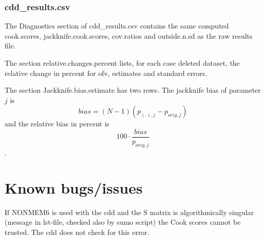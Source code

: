 \subsubsection*{cdd\_results.csv}
The Diagnostics section of
cdd\_results.csv contains the same computed cook.scores, jackknife.cook.scores, cov.ratios and
outside.n.sd as the raw results file.

The section relative.changes.percent lists, for each case deleted dataset, the relative change in percent
for ofv, estimates and standard errors.

The section Jackknife.bias.estimate
has two rows. The jackknife bias of parameter $j$ is \[bias=\left(N-1\right)\left(p_{(\cdot),j}-p_{orig,j}\right) \]
and the relative bias in percent is \[100\cdot\frac{bias}{p_{orig,j}}\].

\section{Known bugs/issues}

If NONMEM6 is used with the cdd and the S matrix is algorithmically singular (message in lst-file, checked also by sumo script) the Cook scores cannot  be trusted. The cdd does not check for this error. 


